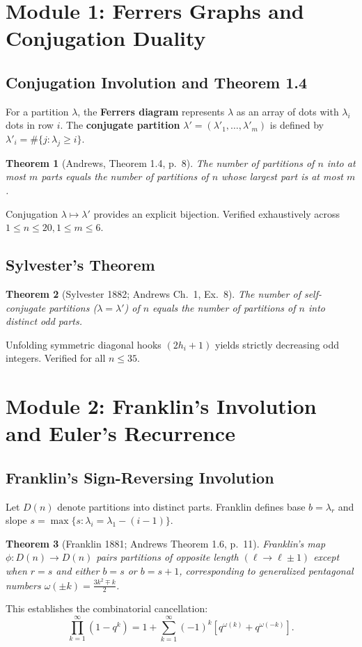 \documentclass[11pt,a4paper]{article}
\newtheorem{theorem}{Theorem}[section]
\begin{document}
\section{Module 1: Ferrers Graphs and Conjugation Duality}

\subsection{Conjugation Involution and Theorem 1.4}
For a partition $\lambda$, the \textbf{Ferrers diagram} represents $\lambda$ as an array of dots with $\lambda_i$ dots in row $i$. The \textbf{conjugate partition} $\lambda' = (\lambda'_1, \dots, \lambda'_m)$ is defined by $\lambda'_i = \#\{j : \lambda_j \ge i\}$.

\begin{theorem}[Andrews, Theorem 1.4, p.~8]
The number of partitions of $n$ into at most $m$ parts equals the number of partitions of $n$ whose largest part is at most $m$.
\end{theorem}
Conjugation $\lambda \mapsto \lambda'$ provides an explicit bijection. Verified exhaustively across $1 \le n \le 20, 1 \le m \le 6$.

\subsection{Sylvester's Theorem}
\begin{theorem}[Sylvester 1882; Andrews Ch.~1, Ex.~8]
The number of self-conjugate partitions ($\lambda = \lambda'$) of $n$ equals the number of partitions of $n$ into distinct odd parts.
\end{theorem}
Unfolding symmetric diagonal hooks $(2h_i + 1)$ yields strictly decreasing odd integers. Verified for all $n \le 35$.

\section{Module 2: Franklin's Involution and Euler's Recurrence}

\subsection{Franklin's Sign-Reversing Involution}
Let $D(n)$ denote partitions into distinct parts. Franklin defines base $b = \lambda_r$ and slope $s = \max\{s : \lambda_i = \lambda_1 - (i-1)\}$.

\begin{theorem}[Franklin 1881; Andrews Theorem 1.6, p.~11]
Franklin's map $\phi : D(n) \to D(n)$ pairs partitions of opposite length $(\ell \to \ell \pm 1)$ except when $r = s$ and either $b = s$ or $b = s + 1$, corresponding to generalized pentagonal numbers $\omega(\pm k) = \frac{3k^2 \mp k}{2}$.
\end{theorem}
This establishes the combinatorial cancellation:
\begin{equation}
\prod_{k=1}^\infty (1 - q^k) = 1 + \sum_{k=1}^\infty (-1)^k \left[ q^{\omega(k)} + q^{\omega(-k)} \right].
\end{equation}
\end{document}
